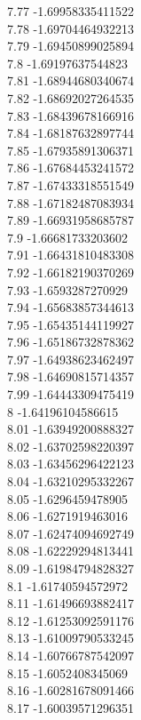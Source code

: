 {7.77	-1.69958335411522\\
7.78	-1.69704464932213\\
7.79	-1.69450899025894\\
7.8	-1.69197637544823\\
7.81	-1.68944680340674\\
7.82	-1.68692027264535\\
7.83	-1.68439678166916\\
7.84	-1.68187632897744\\
7.85	-1.67935891306371\\
7.86	-1.67684453241572\\
7.87	-1.67433318551549\\
7.88	-1.67182487083934\\
7.89	-1.66931958685787\\
7.9	-1.66681733203602\\
7.91	-1.66431810483308\\
7.92	-1.66182190370269\\
7.93	-1.6593287270929\\
7.94	-1.65683857344613\\
7.95	-1.65435144119927\\
7.96	-1.65186732878362\\
7.97	-1.64938623462497\\
7.98	-1.64690815714357\\
7.99	-1.64443309475419\\
8	-1.64196104586615\\
8.01	-1.63949200888327\\
8.02	-1.63702598220397\\
8.03	-1.63456296422123\\
8.04	-1.63210295332267\\
8.05	-1.6296459478905\\
8.06	-1.6271919463016\\
8.07	-1.62474094692749\\
8.08	-1.62229294813441\\
8.09	-1.61984794828327\\
8.1	-1.61740594572972\\
8.11	-1.61496693882417\\
8.12	-1.61253092591176\\
8.13	-1.61009790533245\\
8.14	-1.60766787542097\\
8.15	-1.6052408345069\\
8.16	-1.60281678091466\\
8.17	-1.60039571296351\\
}

